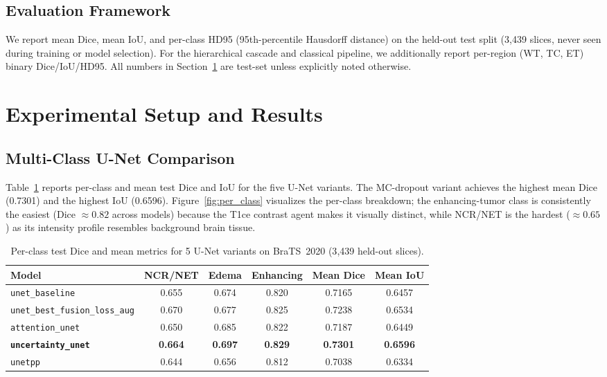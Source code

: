 \documentclass[conference]{IEEEtran}
\begin{document}
\subsection{Evaluation Framework}

We report mean Dice, mean IoU, and per-class HD95 (95th-percentile
Hausdorff distance) on the held-out test split (3{,}439 slices, never
seen during training or model selection). For the hierarchical cascade
and classical pipeline, we additionally report per-region (WT, TC, ET)
binary Dice/IoU/HD95. All numbers in Section~\ref{sec:results} are
test-set unless explicitly noted otherwise.

\section{Experimental Setup and Results}
\label{sec:results}

\subsection{Multi-Class U-Net Comparison}

Table~\ref{tab:multiclass} reports per-class and mean test Dice and
IoU for the five U-Net variants. The MC-dropout variant achieves the
highest mean Dice (0.7301) and the highest IoU (0.6596).
Figure~\ref{fig:per_class} visualizes the per-class breakdown; the
enhancing-tumor class is consistently the easiest (Dice $\approx 0.82$
across models) because the T1ce contrast agent makes it visually
distinct, while NCR/NET is the hardest ($\approx 0.65$) as its
intensity profile resembles background brain tissue.

\begin{table}[htbp]
\caption{Per-class test Dice and mean metrics for 5 U-Net variants
on BraTS~2020 (3{,}439 held-out slices).}
\begin{center}
\begin{tabular}{|l|c|c|c|c|c|}
\hline
\textbf{Model} & \textbf{NCR/NET} & \textbf{Edema} & \textbf{Enhancing} & \textbf{Mean Dice} & \textbf{Mean IoU} \\
\hline
\texttt{unet\_baseline}              & 0.655 & 0.674 & 0.820 & 0.7165 & 0.6457 \\
\hline
\texttt{unet\_best\_fusion\_loss\_aug} & 0.670 & 0.677 & 0.825 & 0.7238 & 0.6534 \\
\hline
\texttt{attention\_unet}             & 0.650 & 0.685 & 0.822 & 0.7187 & 0.6449 \\
\hline
\textbf{\texttt{uncertainty\_unet}}  & \textbf{0.664} & \textbf{0.697} & \textbf{0.829} & \textbf{0.7301} & \textbf{0.6596} \\
\hline
\texttt{unetpp}                      & 0.644 & 0.656 & 0.812 & 0.7038 & 0.6334 \\
\hline
\end{tabular}
\label{tab:multiclass}
\end{center}
\end{table}
\end{document}
